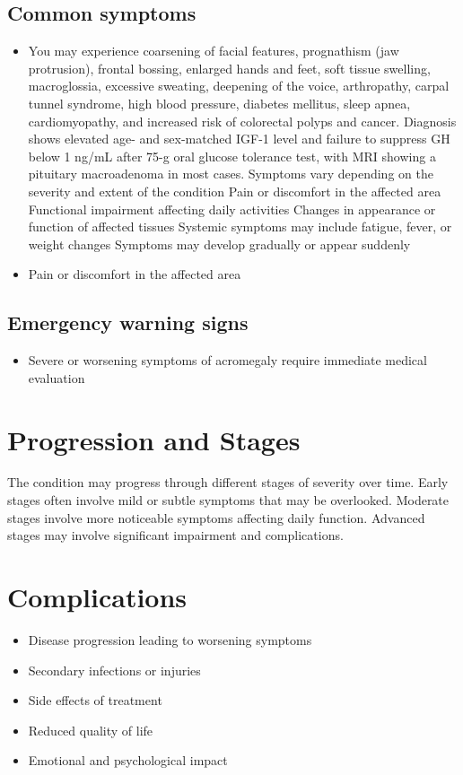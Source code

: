 \subsection{Common symptoms}
\begin{itemize}[noitemsep]
  \item You may experience coarsening of facial features, prognathism (jaw protrusion), frontal bossing, enlarged hands and feet, soft tissue swelling, macroglossia, excessive sweating, deepening of the voice, arthropathy, carpal tunnel syndrome, high blood pressure, diabetes mellitus, sleep apnea, cardiomyopathy, and increased risk of colorectal polyps and cancer. Diagnosis shows elevated age- and sex-matched IGF-1 level and failure to suppress GH below 1 ng/mL after 75-g oral glucose tolerance test, with MRI showing a pituitary macroadenoma in most cases. Symptoms vary depending on the severity and extent of the condition Pain or discomfort in the affected area Functional impairment affecting daily activities Changes in appearance or function of affected tissues Systemic symptoms may include fatigue, fever, or weight changes Symptoms may develop gradually or appear suddenly
  \item Pain or discomfort in the affected area
  \end{itemize}

\subsection{Emergency warning signs}
\begin{itemize}[noitemsep]
  \item Severe or worsening symptoms of acromegaly require immediate medical evaluation
\end{itemize}
\section{Progression and Stages}
The condition may progress through different stages of severity over time. Early stages often involve mild or subtle symptoms that may be overlooked. Moderate stages involve more noticeable symptoms affecting daily function. Advanced stages may involve significant impairment and complications.
\section{Complications}
\begin{itemize}[noitemsep]
  \item Disease progression leading to worsening symptoms
  \item Secondary infections or injuries
  \item Side effects of treatment
  \item Reduced quality of life
  \item Emotional and psychological impact
\end{itemize}

